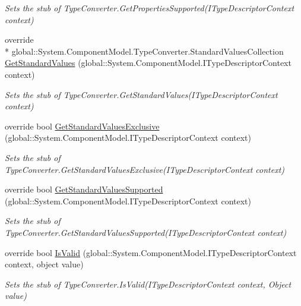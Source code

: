 \begin{DoxyCompactItemize}
\begin{DoxyCompactList}\small\item\em Sets the stub of Type\-Converter.\-Get\-Properties\-Supported(\-I\-Type\-Descriptor\-Context context)\end{DoxyCompactList}\item 
override \\*
global\-::\-System.\-Component\-Model.\-Type\-Converter.\-Standard\-Values\-Collection \hyperlink{class_system_1_1_component_model_1_1_fakes_1_1_stub_type_converter_a9609a8bac51b49b748c7ef8c089907b2}{Get\-Standard\-Values} (global\-::\-System.\-Component\-Model.\-I\-Type\-Descriptor\-Context context)
\begin{DoxyCompactList}\small\item\em Sets the stub of Type\-Converter.\-Get\-Standard\-Values(\-I\-Type\-Descriptor\-Context context)\end{DoxyCompactList}\item 
override bool \hyperlink{class_system_1_1_component_model_1_1_fakes_1_1_stub_type_converter_afed4407a93501150ac65feeb4aa91a9d}{Get\-Standard\-Values\-Exclusive} (global\-::\-System.\-Component\-Model.\-I\-Type\-Descriptor\-Context context)
\begin{DoxyCompactList}\small\item\em Sets the stub of Type\-Converter.\-Get\-Standard\-Values\-Exclusive(\-I\-Type\-Descriptor\-Context context)\end{DoxyCompactList}\item 
override bool \hyperlink{class_system_1_1_component_model_1_1_fakes_1_1_stub_type_converter_abafd518ef4093958b32b61de31fa415d}{Get\-Standard\-Values\-Supported} (global\-::\-System.\-Component\-Model.\-I\-Type\-Descriptor\-Context context)
\begin{DoxyCompactList}\small\item\em Sets the stub of Type\-Converter.\-Get\-Standard\-Values\-Supported(\-I\-Type\-Descriptor\-Context context)\end{DoxyCompactList}\item 
override bool \hyperlink{class_system_1_1_component_model_1_1_fakes_1_1_stub_type_converter_adb3a04fdaed39291bacb82fd17b117f3}{Is\-Valid} (global\-::\-System.\-Component\-Model.\-I\-Type\-Descriptor\-Context context, object value)
\begin{DoxyCompactList}\small\item\em Sets the stub of Type\-Converter.\-Is\-Valid(\-I\-Type\-Descriptor\-Context context, Object value)\end{DoxyCompactList}\end{DoxyCompactItemize}
